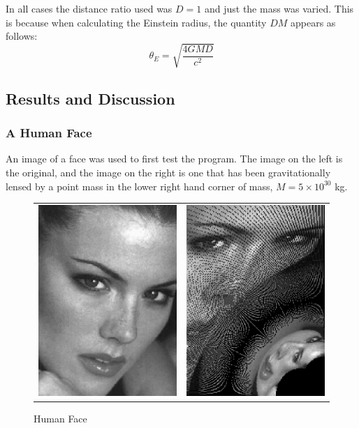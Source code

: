 \documentclass[a4paper]{IEEEtran}
\begin{document}
    In all cases the distance ratio used was $D = 1$ and just the mass
    was varied. This is because when calculating the Einstein radius,
    the quantity $DM$ appears as follows:
    \begin{equation}
        \theta_E = \sqrt{\frac{4GMD}{c^2}}
    \end{equation}

\subsection{Results and Discussion}

\subsubsection{A Human Face}
An image of a face was used to first test the program. The image on the
left is the original, and the image on the right is one that has been
gravitationally lensed by a point mass in the lower right hand corner
of mass, $M = 5 \times 10^{30}$ kg.

\begin{figure}
    \caption{Human Face}
    \label{fig:face} 
    \begin{center}
    \begin{tabular}{cc}
        \includegraphics[width=0.4\columnwidth]{pics/kr.eps} &
        \includegraphics[width=0.4\columnwidth]{pics/kr_5e30.eps} \\
    \end{tabular}
    \end{center}
\end{figure} 
\end{document}
